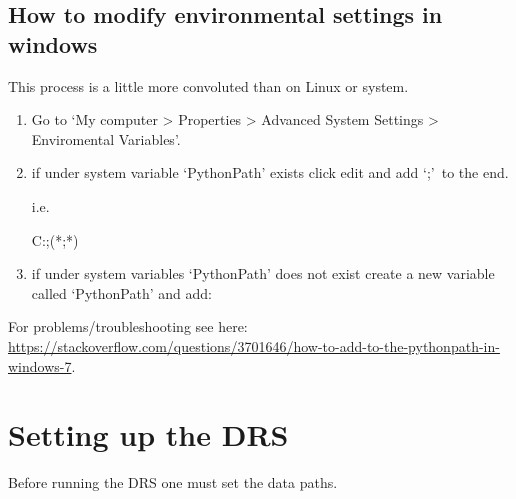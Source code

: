 \subsection{How to modify environmental settings in windows}
\label{ch:install:install_win:environ_settings}

This process is a little more convoluted than on Linux or \mac system.

\begin{enumerate}
\item Go to `My computer > Properties > Advanced System Settings > Enviromental Variables'.

\item if under system variable `PythonPath' exists click edit and add `\InstallDIR;'\, to the end.

\noindent i.e.

\begin{textbox}
C:;(*\InstallDIR;*)
\end{textbox}

\item if under system variables `PythonPath' does not exist create a new variable called `PythonPath' and add:

\begin{textbox}
\end{textbox}

\end{enumerate}

\noindent For problems/troubleshooting see here: \url{https://stackoverflow.com/questions/3701646/how-to-add-to-the-pythonpath-in-windows-7}.



\clearpage
\newpage
\section{Setting up the DRS}
\label{ch:install:setup}

Before running the DRS one must set the data paths. \\




